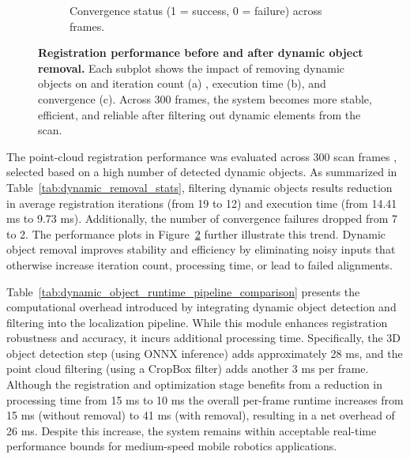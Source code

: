 \begin{figure}[H]
\begin{subfigure}[t]{0.48\textwidth}
		 \caption{Convergence status (1 = success, 0 = failure) across frames.}
		\label{fig:reg_converge}
	\end{subfigure}
	\caption[Point-cloud Registration Performance with and without Dynamic Object Removal]{\textbf{Registration performance before and after dynamic object removal.} Each subplot shows the impact of removing dynamic objects on and iteration count (a) , execution time (b), and convergence (c). Across 300 frames, the system becomes more stable, efficient, and reliable after filtering out dynamic elements from the scan.}
	\label{fig:registration_metrics_comparison}
\end{figure}


The point-cloud registration performance was evaluated across 300 scan frames , selected based on a high number of detected dynamic objects. As summarized in Table~\ref{tab:dynamic_removal_stats}, filtering dynamic objects results  reduction in average registration iterations (from 19 to 12) and execution time (from 14.41 ms to 9.73 ms). Additionally, the number of convergence failures dropped from 7 to 2. The performance plots in Figure~\ref{fig:registration_metrics_comparison} further illustrate this trend. Dynamic object removal improves stability and efficiency by eliminating noisy inputs that otherwise increase iteration count, processing time, or lead to failed alignments.


Table~\ref{tab:dynamic_object_runtime_pipeline_comparison} presents the computational overhead introduced by integrating dynamic object detection and filtering into the localization pipeline. While this module enhances registration robustness and accuracy, it incurs additional processing time. Specifically, the 3D object detection step (using ONNX inference) adds approximately 28 ms, and the point cloud filtering (using a CropBox filter) adds another 3 ms per frame. Although the registration and optimization stage benefits from a reduction in processing time from 15 ms to 10 ms the overall per-frame runtime increases from 15 ms (without removal) to 41 ms (with removal), resulting in a net overhead of 26 ms. Despite this increase, the system remains within acceptable real-time performance bounds for medium-speed mobile robotics applications.


